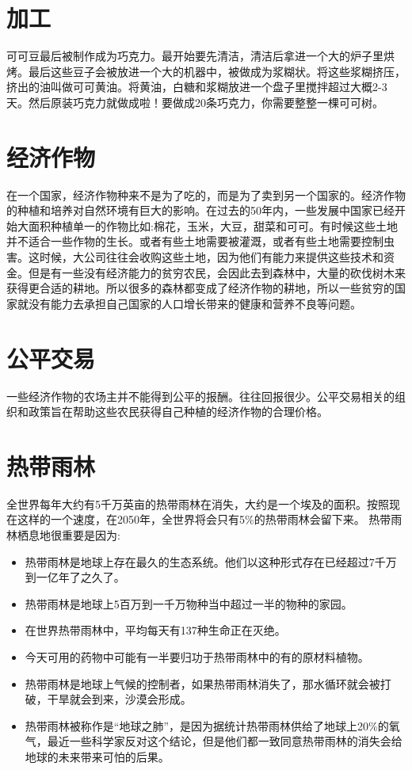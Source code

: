 \section{加工}
     可可豆最后被制作成为巧克力。最开始要先清洁，清洁后拿进一个大的炉子里烘烤。最后这些豆子会被放进一个大的机器中，被做成为浆糊状。将这些浆糊挤压，挤出的油叫做可可黄油。将黄油，白糖和浆糊放进一个盘子里搅拌超过大概2-3天。然后原装巧克力就做成啦！要做成20条巧克力，你需要整整一棵可可树。


\section{经济作物}
    在一个国家，经济作物种来不是为了吃的，而是为了卖到另一个国家的。经济作物的种植和培养对自然环境有巨大的影响。在过去的50年内，一些发展中国家已经开始大面积种植单一的作物比如:棉花，玉米，大豆，甜菜和可可。有时候这些土地并不适合一些作物的生长。或者有些土地需要被灌溉，或者有些土地需要控制虫害。这时候，大公司往往会收购这些土地，因为他们有能力来提供这些技术和资金。但是有一些没有经济能力的贫穷农民，会因此去到森林中，大量的砍伐树木来获得更合适的耕地。所以很多的森林都变成了经济作物的耕地，所以一些贫穷的国家就没有能力去承担自己国家的人口增长带来的健康和营养不良等问题。


\section{公平交易}
    一些经济作物的农场主并不能得到公平的报酬。往往回报很少。公平交易相关的组织和政策旨在帮助这些农民获得自己种植的经济作物的合理价格。


\section{热带雨林}
    全世界每年大约有5千万英亩的热带雨林在消失，大约是一个埃及的面积。按照现在这样的一个速度，在2050年，全世界将会只有5\%的热带雨林会留下来。
    热带雨林栖息地很重要是因为:\par
    \begin{itemize}
       \item 热带雨林是地球上存在最久的生态系统。他们以这种形式存在已经超过7千万到一亿年了之久了。
       \item 热带雨林是地球上5百万到一千万物种当中超过一半的物种的家园。
       \item 在世界热带雨林中，平均每天有137种生命正在灭绝。
       \item 今天可用的药物中可能有一半要归功于热带雨林中的有的原材料植物。
       \item 热带雨林是地球上气候的控制者，如果热带雨林消失了，那水循环就会被打破，干旱就会到来，沙漠会形成。
       \item 热带雨林被称作是“地球之肺”，是因为据统计热带雨林供给了地球上20\%的氧气，最近一些科学家反对这个结论，但是他们都一致同意热带雨林的消失会给地球的未来带来可怕的后果。
    \end{itemize}  
    

    


